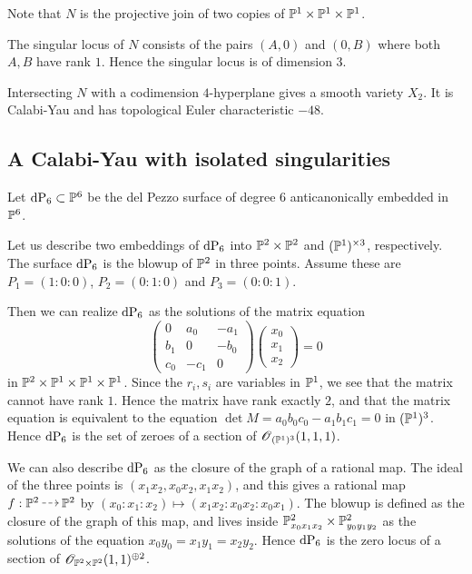 \documentclass[11pt, english]{article}
\begin{document}
Note that $N$ is the projective join of two copies of $\mathbb{P}^1 \times \mathbb{P}^1 \times \mathbb{P}^1$.

The singular locus of $N$ consists of the pairs $(A,0)$ and $(0,B)$ where both $A,B$ have rank $1$. Hence the singular locus is of dimension $3$.

Intersecting $N$ with a codimension $4$-hyperplane gives a smooth variety $X_2$. It is Calabi-Yau and has topological Euler characteristic $-48$.

\subsection{A Calabi-Yau with isolated singularities}

Let $\dP6 \subset \PP^6$ be the del Pezzo surface of degree $6$ anticanonically embedded in $\mathbb{P}^6$.

Let us describe two embeddings of $\dP6$ into $\mathbb{P}^2 \times \mathbb{P}^2$ and $(\mathbb{P}^1)^{\times 3}$, respectively. The surface $\dP6$ is the blowup of $\mathbb{P}^2$ in three points. Assume these are $P_1=(1:0:0)$, $P_2= (0:1:0)$ and $P_3=(0:0:1)$.

Then we can realize $\dP6$ as the solutions of the matrix equation
\[
\begin{pmatrix}
0 & a_0 & -a_1 \\  %
b_1 & 0 & -b_0 \\
c_0 & -c_1 & 0
\end{pmatrix}
\begin{pmatrix}
x_0 \\ x_1 \\ x_2
\end{pmatrix} = 0
\]
in $\mathbb P^2 \times \mathbb{P}^1 \times \mathbb{P}^1 \times \mathbb{P}^1$. Since the $r_i,s_i$ are variables in $\mathbb{P}^1$, we see that the matrix cannot have rank $1$. Hence the matrix have rank exactly $2$, and that the matrix equation is equivalent to the equation $\det M =a_0b_0c_0-a_1b_1c_1= 0$ in $(\mathbb{P}^1)^3$. Hence $\dP6$ is the set of zeroes of a section of $\operatorname{\mathscr{O}}_{(\mathbb{P}^1)^3}(1,1,1)$.

We can also describe $\dP6$ as the closure of the graph of a rational map. The ideal of the three points is $(x_1x_2,x_0x_2,x_1x_2)$, and this gives a rational map $f: \PP^2 \rmap  \PP^2$ by $(x_0:x_1:x_2) \mapsto (x_1x_2:x_0x_2:x_0x_1)$. The blowup is defined as the closure of the graph of this map, and lives inside $\mathbb{P}^2_{x_0x_1x_2} \times \mathbb{P}^2_{y_0y_1y_2}$ as the solutions of the equation $x_0y_0=x_1y_1=x_2y_2$. Hence $\dP6$ is the zero locus of a section of $\mathscr O_{\mathbb{P}^2 \times \mathbb{P}^2}(1,1)^{\oplus 2}$.
\end{document}
